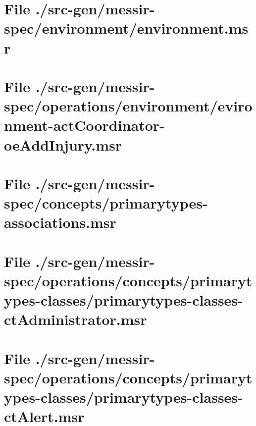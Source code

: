 \section[File /src-gen/messir-spec/environment/environment.msr]{File ./src-gen/messir-spec/environment/environment.msr}
\scriptsize

\normalsize
	
\section[File /src-gen/messir-spec.../evironment-actCoordinator-oeAddInjury.msr]{File ./src-gen/messir-spec/operations/environment/evironment-actCoordinator-oeAddInjury.msr}
\scriptsize

\normalsize
	
\section[File /src-gen/messir-spec/concepts/primarytypes-associations.msr]{File ./src-gen/messir-spec/concepts/primarytypes-associations.msr}
\scriptsize

\normalsize
	
\section[File /src-gen/messir-spec.../primarytypes-classes-ctAdministrator.msr]{File ./src-gen/messir-spec/operations/concepts/primarytypes-classes/primarytypes-classes-ctAdministrator.msr}
\scriptsize

\normalsize
	
\section[File /src-gen/messir-spec/operations.../primarytypes-classes-ctAlert.msr]{File ./src-gen/messir-spec/operations/concepts/primarytypes-classes/primarytypes-classes-ctAlert.msr}
\scriptsize

\normalsize
	
